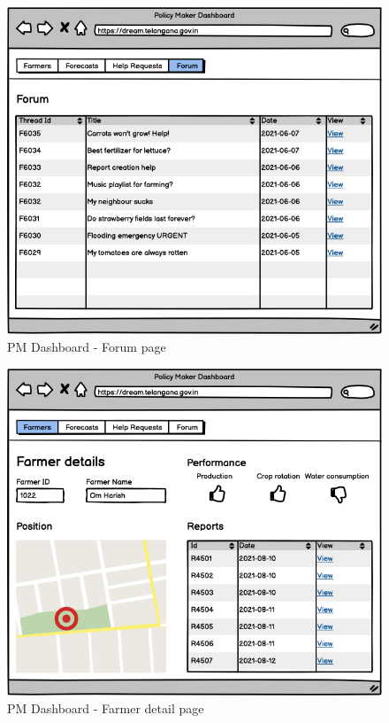 \documentclass[10pt]{article}
\begin{document}
\begin{figure}[ht!]
    \centering
    \includegraphics[scale=0.40]{ui/pm_forum.png}
    \caption{PM Dashboard - Forum page}
\end{figure}
\begin{figure}[ht!]
    \centering
    \includegraphics[scale=0.40]{ui/pm_farmerdetail.png}
    \caption{PM Dashboard - Farmer detail page}
\end{figure}
\end{document}
